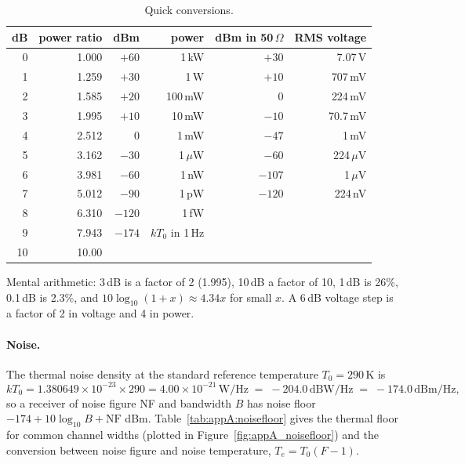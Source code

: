 \begin{table}[htbp]\centering\small
\caption{Quick conversions.}\label{tab:appA:dbquick}
\begin{tabular}{@{}rr@{\qquad}rr@{\qquad}rr@{}}
\toprule
dB & power ratio & dBm & power & dBm in 50\,$\Omega$ & RMS voltage\\
\midrule
0 & 1.000 & $+60$ & 1\,kW & $+30$ & 7.07\,V\\
1 & 1.259 & $+30$ & 1\,W & $+10$ & 707\,mV\\
2 & 1.585 & $+20$ & 100\,mW & $0$ & 224\,mV\\
3 & 1.995 & $+10$ & 10\,mW & $-10$ & 70.7\,mV\\
4 & 2.512 & $0$ & 1\,mW & $-47$ & 1\,mV\\
5 & 3.162 & $-30$ & 1\,$\mu$W & $-60$ & 224\,$\mu$V\\
6 & 3.981 & $-60$ & 1\,nW & $-107$ & 1\,$\mu$V\\
7 & 5.012 & $-90$ & 1\,pW & $-120$ & 224\,nV\\
8 & 6.310 & $-120$ & 1\,fW & & \\
9 & 7.943 & $-174$ & $kT_0$ in 1\,Hz & & \\
10 & 10.00 & & & & \\
\bottomrule
\end{tabular}
\end{table}

Mental arithmetic: 3\,dB is a factor of 2 (1.995), 10\,dB a factor of 10, 1\,dB is 26\%, 0.1\,dB
is 2.3\%, and $10\log_{10}(1+x)\approx4.34x$ for small $x$. A 6\,dB voltage step is a factor of 2
in voltage and 4 in power.

\paragraph{Noise.} The thermal noise density at the standard reference temperature
$T_0=290$\,K is
\begin{equation}
kT_0=1.380649\times10^{-23}\times290=4.00\times10^{-21}\,\mathrm{W/Hz}\;=\;-204.0\,\mathrm{dBW/Hz}\;=\;-174.0\,\mathrm{dBm/Hz},
\label{eq:appA:kt0}
\end{equation}
so a receiver of noise figure NF and bandwidth $B$ has noise floor
$-174+10\log_{10}B+\mathrm{NF}$ dBm. Table~\ref{tab:appA:noisefloor} gives the thermal floor for
common channel widths (plotted in Figure~\ref{fig:appA_noisefloor}) and the conversion between
noise figure and noise temperature, $T_e=T_0(F-1)$.

